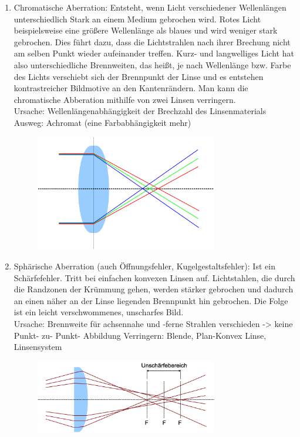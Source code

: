 \documentclass[a4paper, 11pt, ngerman, parskip=half-]{scrartcl}
\begin{document}
\begin{enumerate}
    \item Chromatische Aberration: Entsteht, wenn Licht verschiedener Wellenlängen unterschiedlich Stark an einem Medium gebrochen wird. Rotes Licht beispielsweise eine größere Wellenlänge als blaues und wird weniger stark gebrochen. Dies führt dazu, dass die Lichtstrahlen nach ihrer Brechung nicht am selben Punkt wieder aufeinander treffen. Kurz- und langwelliges Licht hat also unterschiedliche Brennweiten, das heißt, je nach Wellenlänge bzw. Farbe des Lichts verschiebt sich der Brennpunkt der Linse und es entstehen kontrastreicher Bildmotive an den Kantenrändern. Man kann die chromatische Abberation mithilfe von zwei Linsen verringern.\\

          Ursache: Wellenlängenabhängigkeit der Brechzahl des Linsenmaterials\\
          Ausweg: Achromat (eine Farbabhängigkeit mehr)

          \begin{figure}[H]
              \centering
              \includegraphics[width=8cm]{image/18/geo2chrom}
          \end{figure}

    \item Sphärische Aberration (auch Öffnungsfehler, Kugelgestaltsfehler): Ist ein Schärfefehler. Tritt bei einfachen konvexen Linsen auf. Lichtstahlen, die durch die Randzonen der Krümmung gehen, werden stärker gebrochen und dadurch an einen näher an der Linse liegenden Brennpunkt hin gebrochen. Die Folge ist ein leicht verschwommenes, unscharfes Bild.\\


          Ursache: Brennweite für achsennahe und -ferne Strahlen verschieden -> keine Punkt- zu- Punkt- Abbildung
          Verringern: Blende, Plan-Konvex Linse, Linsensystem

          \begin{figure}[H]
              \centering
              \includegraphics[width=8cm]{image/18/geo2sphae}
          \end{figure}


\end{enumerate}
\end{document}
